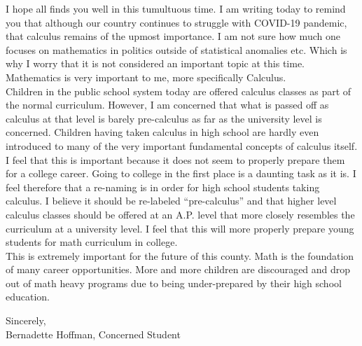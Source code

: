 \documentclass[oneside]{book}
\begin{document}
\begin{flushleft}
I hope all finds you well in this tumultuous time. I am writing today to remind you that although our country continues to struggle with COVID-19 pandemic, that calculus remains of the upmost importance. I am not sure how much one focuses on mathematics in politics outside of statistical anomalies etc. Which is why I worry that it is not considered an important topic at this time. Mathematics is very important to me, more specifically Calculus. \\
\bigskip
Children in the public school system today are offered calculus classes as part of the normal curriculum. However, I am concerned that what is passed off as calculus at that level is barely pre-calculus as far as the university level is concerned. Children having taken calculus in high school are hardly even introduced to many of the very important fundamental concepts of calculus itself. I feel that this is important because it does not seem to properly prepare them for a college career. Going to college in the first place is a daunting task as it is. I feel therefore that a re-naming is in order for high school students taking calculus. I believe it should be re-labeled “pre-calculus” and that higher level calculus classes should be offered at an A.P. level that more closely resembles the curriculum at a university level. I feel that this will more properly prepare young students for math curriculum in college. \\
\bigskip
This is extremely important for the future of this county. Math is the foundation of many career opportunities. More and more children are discouraged and drop out of math heavy programs due to being under-prepared by their high school education.\\
\vspace{.25in} 

Sincerely,\\ 

Bernadette Hoffman, Concerned Student
\end{flushleft}

\newpage
\end{document}
